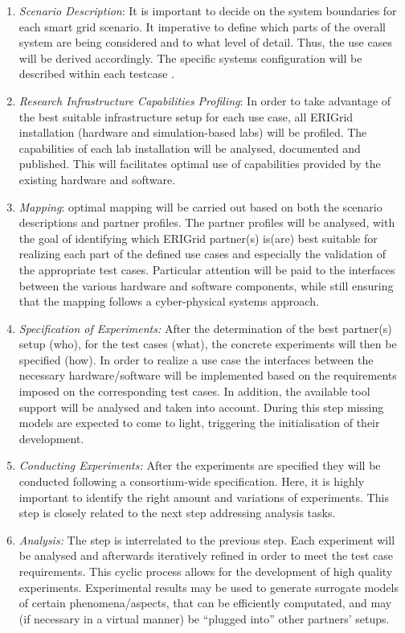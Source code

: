 \documentclass[runningheads,a4paper]{llncs}
\begin{document}
\begin{enumerate}
	\item \textit{Scenario Description}: It is important to decide on the system boundaries for each smart grid scenario. It imperative to define which parts of the overall system are being considered and to what level of detail. Thus, the use cases will be derived accordingly. The specific systems configuration will be described within each testcase .
	\item \textit{Research Infrastructure Capabilities Profiling}: In order to take advantage of the best suitable infrastructure setup for each use case, all ERIGrid installation (hardware and simulation-based labs) will be profiled. The capabilities of each lab installation will be analysed, documented and published. This will facilitates optimal use of capabilities provided by the existing hardware and software. 
	\item \textit{Mapping}: optimal mapping will be carried out based on both the scenario descriptions and partner profiles. The partner profiles will be analysed, with the goal of identifying which ERIGrid partner(s) is(are) best suitable for realizing each part of the defined use cases and especially the validation of the appropriate test cases. Particular attention will be paid to the interfaces between the various hardware and software components, while still ensuring that the mapping follows a cyber-physical systems approach.  
	\item \textit{Specification of Experiments:} After the determination of the best partner(s) setup (who), for the test cases (what), the concrete experiments will then be specified (how). In order to realize a use case the interfaces between the necessary hardware/software will be implemented based on the requirements imposed on the corresponding test cases. In addition, the available tool support will be analysed and taken into account. During this step missing models are expected to come to light, triggering the initialisation of their development. 
	\item \textit{Conducting Experiments:} After the experiments are specified they will be conducted following a consortium-wide specification. Here, it is highly important to identify the right amount and variations of experiments. This step is closely related to the next step addressing analysis tasks. 
	\item \textit{Analysis:} The step is interrelated to the previous step. Each experiment will be analysed and afterwards iteratively refined in order to meet the test case requirements. This cyclic process allows for the development of high quality experiments. Experimental results may be used to generate surrogate models of certain phenomena/aspects, that can be efficiently computated,  and may (if necessary in a virtual manner) be ``plugged into'' other partners’ setups.

\end{enumerate}
\end{document}
